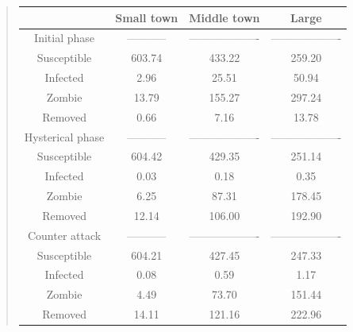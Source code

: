 \documentclass[%
twoside,                 %
final,                   %
10pt]{article}
\begin{document}
\label{table:compare_phases_zombie}

\begin{quote}
\begin{tabular}{cccc}
\hline
\multicolumn{1}{c}{  } & \multicolumn{1}{c}{ Small town } & \multicolumn{1}{c}{ Middle town } & \multicolumn{1}{c}{ Large } \\
\hline
Initial phase       & -----------         & ------------------- & ------------------- \\
\hline
Susceptible         & 603.74              & 433.22              & 259.20              \\
Infected            & 2.96                & 25.51               & 50.94               \\
Zombie              & 13.79               & 155.27              & 297.24              \\
Removed             & 0.66                & 7.16                & 13.78               \\
\hline
Hysterical phase    & -----------         & ------------------- & ------------------- \\
\hline
Susceptible         & 604.42              & 429.35              & 251.14              \\
Infected            & 0.03                & 0.18                & 0.35                \\
Zombie              & 6.25                & 87.31               & 178.45              \\
Removed             & 12.14               & 106.00              & 192.90              \\
\hline
Counter attack      & -----------         & ------------------- & ------------------- \\
\hline
Susceptible         & 604.21              & 427.45              & 247.33              \\
Infected            & 0.08                & 0.59                & 1.17                \\
Zombie              & 4.49                & 73.70               & 151.44              \\
Removed             & 14.11               & 121.16              & 222.96              \\
\hline
\end{tabular}
\end{quote}

\noindent
\end{document}
